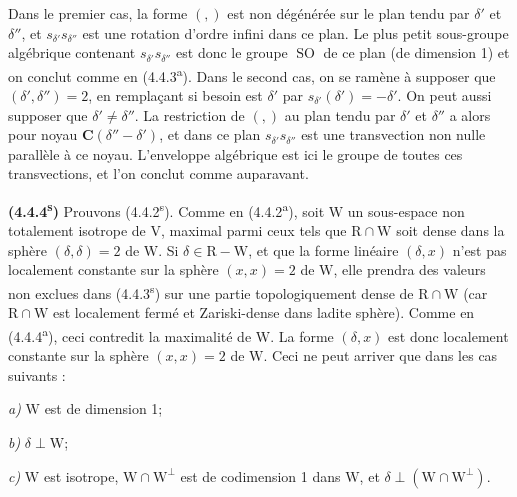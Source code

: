 \documentclass[11pt,leqno]{article}
\begin{document}
Dans le premier cas, la forme \((,)\) est non dégénérée sur le plan tendu par \(\delta'\) et \(\delta''\), et \(s_{\delta'}s_{\delta''}\) est une rotation d’ordre infini dans ce plan. Le plus petit sous-groupe algébrique contenant \(s_{\delta'}s_{\delta''}\) est donc le groupe \(\operatorname{SO}\) de ce plan (de dimension 1) et on conclut comme en (4.4.3\textsuperscript{a}). Dans le second cas, on se ramène à supposer que \((\delta',\delta'')=2\), en remplaçant si besoin est \(\delta'\) par \(s_{\delta'}(\delta')=-\delta'\). On peut aussi supposer que \(\delta'\neq\delta''\). La restriction de \((,)\) au plan tendu par \(\delta'\) et \(\delta''\) a alors pour noyau \(\mathbf{C}(\delta''-\delta')\), et dans ce plan \(s_{\delta'}s_{\delta''}\) est une transvection non nulle parallèle à ce noyau. L’enveloppe algébrique est ici le groupe de toutes ces transvections, et l’on conclut comme auparavant.

\textbf{(4.4.4\textsuperscript{s})} Prouvons (4.4.2\textsuperscript{s}). Comme en (4.4.2\textsuperscript{a}), soit \(\mathrm{W}\) un sous-espace non totalement isotrope de \(\mathrm{V}\), maximal parmi ceux tels que \(\mathrm{R}\cap\mathrm{W}\) soit dense dans la sphère \((\delta,\delta)=2\) de \(\mathrm{W}\). Si \(\delta\in\mathrm{R}-\mathrm{W}\), et que la forme linéaire \((\delta,x)\) n’est pas localement constante sur la sphère \((x,x)=2\) de \(\mathrm{W}\), elle prendra des valeurs non exclues dans (4.4.3\textsuperscript{s}) sur une partie topologiquement dense de \(\mathrm{R}\cap\mathrm{W}\) (car \(\mathrm{R}\cap\mathrm{W}\) est localement fermé et Zariski-dense dans ladite sphère). Comme en (4.4.4\textsuperscript{a}), ceci contredit la maximalité de \(\mathrm{W}\). La forme \((\delta,x)\) est donc localement constante sur la sphère \((x,x)=2\) de \(\mathrm{W}\). Ceci ne peut arriver que dans les cas suivants :
\par\noindent\textit{a)} \(\mathrm{W}\) est de dimension 1;
\par\noindent\textit{b)} \(\delta\perp\mathrm{W}\);
\par\noindent\textit{c)} \(\mathrm{W}\) est isotrope, \(\mathrm{W}\cap\mathrm{W}^{\perp}\) est de codimension 1 dans \(\mathrm{W}\), et \(\delta\perp(\mathrm{W}\cap\mathrm{W}^{\perp})\).
\end{document}
